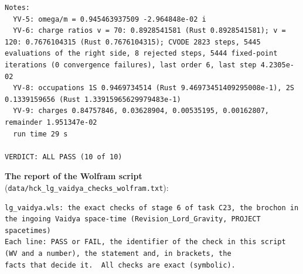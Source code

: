 \documentclass[
  10pt,
]{article}
\begin{document}
\begin{verbatim}
Notes:
  YV-5: omega/m = 0.945463937509 -2.964848e-02 i
  YV-6: charge ratios v = 70: 0.8928541581 (Rust 0.8928541581); v = 120: 0.7676104315 (Rust 0.7676104315); CVODE 2823 steps, 5445 evaluations of the right side, 8 rejected steps, 5444 fixed-point iterations (0 convergence failures), last order 6, last step 4.2305e-02
  YV-8: occupations 1S 0.9469734514 (Rust 9.46973451409295008e-1), 2S 0.1339159656 (Rust 1.33915965629979483e-1)
  YV-9: charges 0.84757846, 0.03628904, 0.00535195, 0.00162807, remainder 1.951347e-02
  run time 29 s

VERDICT: ALL PASS (10 of 10)
\end{verbatim}

\textbf{The report of the Wolfram script}
(\texttt{data/hck\_lg\_vaidya\_checks\_wolfram.txt}):

\begin{verbatim}
lg_vaidya.wls: the exact checks of stage 6 of task C23, the brochon in the ingoing Vaidya space-time (Revision_Lord_Gravity, PROJECT spacetimes)
Each line: PASS or FAIL, the identifier of the check in this script (WV and a number), the statement and, in brackets, the
facts that decide it.  All checks are exact (symbolic).


\end{verbatim}
\end{document}

